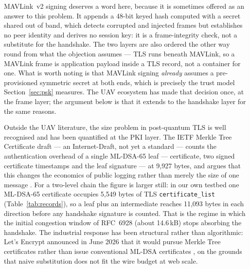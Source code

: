 \documentclass[drones,article,submit,pdftex,moreauthors]{Definitions/mdpi}
\newcommand{\mldsa}{ML-DSA}
\newcommand{\mav}{MAVLink}
\newcommand{\tls}{TLS}
\begin{document}
\mav{}~v2 signing deserves a word here, because it is sometimes offered
as an answer to this problem. It appends a 48-bit keyed hash computed
with a secret shared out of band, which detects corrupted and injected
frames but establishes no peer identity and derives no session key: it
is a frame-integrity check, not a substitute for the handshake. The two
layers are also ordered the other way round from what the objection
assumes --- \tls{} runs beneath \mav{}, so a \mav{} frame is application
payload inside a \tls{} record, not a container for one. What is worth
noting is that \mav{} signing \emph{already} assumes a pre-provisioned
symmetric secret at both ends, which is precisely the trust model
Section~\ref{sec:psk} measures. The UAV ecosystem has made that
decision once, at the frame layer; the argument below is that it extends
to the handshake layer for the same reasons.

Outside the UAV literature, the size problem in post-quantum \tls{} is
well recognised and has been quantified at the PKI layer. The IETF
Merkle Tree Certificate draft --- an Internet-Draft, not yet a standard
--- counts the authentication overhead of a
single \mldsa{}-65 leaf --- certificate, two signed certificate
timestamps and the leaf signature --- at 9{,}927 bytes, and argues that
this changes the economics of public logging rather than merely the
size of one message \cite{mtc2026draft}. For a two-level chain the
figure is larger still: in our own testbed one \mldsa{}-65 certificate
occupies 5{,}549 bytes of \tls{} \texttt{certificate\_list}
(Table~\ref{tab:records}), so a leaf plus an intermediate reaches
11{,}093 bytes in each direction before any handshake signature is
counted. That is the regime in which the initial congestion window of
RFC~6928 \cite{rfc6928} (about 14.6\,kB) stops absorbing the handshake.
The industrial response has been structural rather than algorithmic:
Let's Encrypt announced in June 2026 that it would pursue Merkle Tree
certificates rather than issue conventional \mldsa{} certificates
\cite{lec2026pq}, on the grounds that naive substitution does not fit
the wire budget at web scale.
\end{document}
